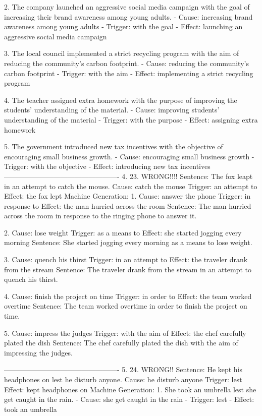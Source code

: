 2. The company launched an aggressive social media campaign with the goal of increasing their brand awareness among young adults.
   - Cause: increasing brand awareness among young adults
   - Trigger: with the goal
   - Effect: launching an aggressive social media campaign

3. The local council implemented a strict recycling program with the aim of reducing the community's carbon footprint.
   - Cause: reducing the community's carbon footprint
   - Trigger: with the aim
   - Effect: implementing a strict recycling program

4. The teacher assigned extra homework with the purpose of improving the students' understanding of the material.
   - Cause: improving students' understanding of the material
   - Trigger: with the purpose
   - Effect: assigning extra homework

5. The government introduced new tax incentives with the objective of encouraging small business growth.
   - Cause: encouraging small business growth
   - Trigger: with the objective
   - Effect: introducing new tax incentives
-------------------------------------------------
4.
23. WRONG!!!!
Sentence: The fox leapt in an attempt to catch the mouse.
Cause: catch the mouse
Trigger: an attempt to
Effect: the fox lept
Machine Generation: 
1. Cause: answer the phone  
   Trigger: in response to  
   Effect: the man hurried across the room  
   Sentence: The man hurried across the room in response to the ringing phone to answer it.

2. Cause: lose weight  
   Trigger: as a means to  
   Effect: she started jogging every morning  
   Sentence: She started jogging every morning as a means to lose weight.

3. Cause: quench his thirst  
   Trigger: in an attempt to  
   Effect: the traveler drank from the stream  
   Sentence: The traveler drank from the stream in an attempt to quench his thirst.

4. Cause: finish the project on time  
   Trigger: in order to  
   Effect: the team worked overtime  
   Sentence: The team worked overtime in order to finish the project on time.

5. Cause: impress the judges  
   Trigger: with the aim of  
   Effect: the chef carefully plated the dish  
   Sentence: The chef carefully plated the dish with the aim of impressing the judges.
   
-------------------------------------------------
5.
24. WRONG!!
Sentence: He kept his headphones on lest he disturb anyone.
Cause: he disturb anyone
Trigger: lest
Effect: kept headphones on
Machine Generation: 
1. She took an umbrella lest she get caught in the rain.
   - Cause: she get caught in the rain
   - Trigger: lest
   - Effect: took an umbrella

